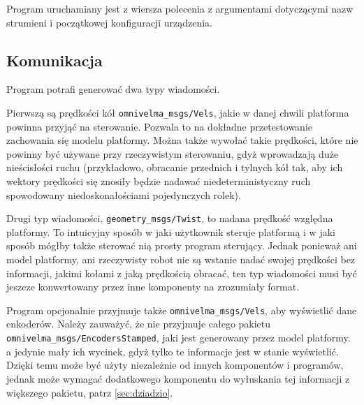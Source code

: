 			Program uruchamiany jest z wiersza polecenia z argumentami dotyczącymi nazw strumieni i początkowej konfiguracji urządzenia.
		
		\subsection{Komunikacja}
			Program potrafi generować dwa typy wiadomości.
			
			Pierwszą są prędkości kół \texttt{omnivelma\_msgs/Vels}, jakie w danej chwili platforma powinna przyjąć na sterowanie.
			Pozwala to na dokładne przetestowanie zachowania się modelu platformy.
			Można także wywołać takie prędkości, które nie powinny być używane przy rzeczywistym sterowaniu, gdyż wprowadzają duże nieścisłości ruchu 
			(przykładowo, obracanie przednich i tylnych kół tak, aby ich wektory prędkości się znosiły będzie nadawać niedeterministyczny ruch spowodowany niedoskonałościami
			pojedynczych rolek).
			
			Drugi typ wiadomości, \texttt{geometry\_msgs/Twist}, to nadana prędkość względna platformy.
			To intuicyjny sposób w jaki użytkownik steruje platformą i w jaki sposób mógłby także sterować nią prosty program sterujący.
			Jednak ponieważ ani model platformy, ani rzeczywisty robot nie są wstanie nadać swojej prędkości bez informacji, jakimi kołami z jaką prędkością obracać,
			ten typ wiadomości musi być jeszcze konwertowany przez inne komponenty na zrozumiały format.
			
			Program opcjonalnie przyjmuje także \texttt{omnivelma\_msgs/Vels}, aby wyświetlić dane enkoderów.
			Należy zauważyć, że nie przyjmuje całego pakietu \texttt{omnivelma\_msgs/EncodersStamped}, jaki jest generowany przez model platformy.
			a jedynie mały ich wycinek, gdyż tylko te informacje jest w stanie wyświetlić.
			Dzięki temu może być użyty niezależnie od innych komponentów i programów, jednak może wymagać dodatkowego komponentu do wyłuskania tej informacji z większego pakietu,
			patrz \ref{sec:dziadzio}.
			
